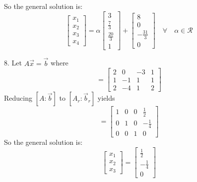 \documentclass[11pt]{homework}
\begin{document}
So the general solution is:
\begin{equation*}
  \begin{bmatrix}
  x_1 \\
  x_2 \\
  x_3 \\
  x_4
  \end{bmatrix}
  =
  \alpha
  \begin{bmatrix}
  3 \\
  \frac{7}{3} \\
  \frac{20}{3} \\
  1
  \end{bmatrix}
  +
  \begin{bmatrix}
  8 \\
  0 \\
  -\frac{31}{3} \\
  0
  \end{bmatrix}
  \quad \forall \quad \alpha \in \mathcal{R}
\end{equation*}

8. Let $ A \vec x = \vec b$ where
\begin{equation*}
  [A: \vec b] =
  \left[
  \begin{array}{ccc|c}
  2 & 0 & -3 & 1 \\
  1 & -1 & 1 & 1 \\
  2 & -4 & 1 & 2
  \end{array}
  \right]
\end{equation*}
Reducing $[A: \vec b]$ to $[A_r: \vec b_r]$ yields
\begin{equation*}
  [A_r: \vec b_r] = 
  \left[
  \begin{array}{ccc|c}
  1 & 0 & 0 & \frac{1}{2} \\
  0 & 1 & 0 & -\frac{1}{4} \\
  0 & 0 & 1 & 0
  \end{array}
  \right]
\end{equation*}
So the general solution is:
\begin{equation*}
  \begin{bmatrix}
    x_1 \\
    x_2 \\
    x_3 
  \end{bmatrix}
  = 
  \begin{bmatrix}
  \frac{1}{2} \\
  -\frac{1}{4} \\
  0
  \end{bmatrix}
\end{equation*}
\end{document}
